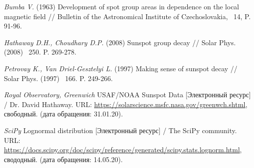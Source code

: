 \documentclass[a4paper, 12pt]{article}
\begin{document}
\begingroup
\renewcommand{\section}[2]{}
\begin{thebibliography}{}
\hypertarget{bumba}{}
\textit{Bumba V.} (1963) Development of spot group areas in dependence on the local magnetic field // Bulletin of the Astronomical Institute of Czechoslovakia, \textnumero\, 14, P. 91-96.

\hypertarget{hathaway}{}
\textit{Hathaway D.H., Choudhary D.P.} (2008) Sunspot group decay // Solar Phys. (2008) \textnumero\, 250. P. 269-278.

\hypertarget{petrovay}{}
\textit{Petrovay K., Van Driel-Gesztelyi L.} (1997) Making sense of sunspot decay // Solar Phys. (1997) \textnumero\, 166. P. 249-266.

\hypertarget{rgo}{}
\textit{Royal Observatory, Greenwich} USAF/NOAA Sunspot Data [Электронный ресурс] / Dr. David Hathaway. URL: \url{https://solarscience.msfc.nasa.gov/greenwch.shtml}, свободный. (дата обращения: 31.01.20).

\hypertarget{scipy}{}
\textit{SciPy} Lognormal distribution [Электронный ресурс] / The SciPy community. URL: \url{https://docs.scipy.org/doc/scipy/reference/generated/scipy.stats.lognorm.html}, свододный. (дата обращения: 14.05.20).
\end{thebibliography}{}
\endgroup
\end{document}

